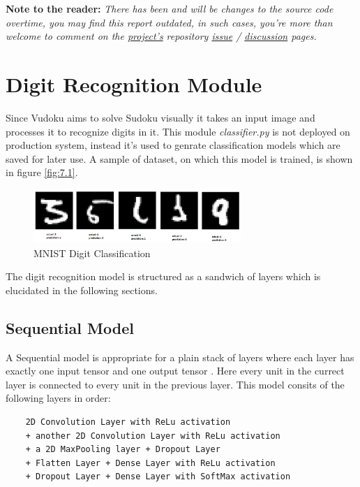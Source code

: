 \documentclass[12pt, a4paper]{report}
\begin{document}
\textbf{Note to the reader:} \textit{There has been and will be changes to the source code overtime, you may find this report outdated, in such cases, you're more than welcome to comment on the \href{https://github.com/joe733/vudoku}{project's} repository \href{https://github.com/joe733/vudoku/issues}{issue} / \href{https://github.com/joe733/vudoku/discussions}{discussion} pages.}

\section{Digit Recognition Module}
\label{sec:drm}
\hspace{0.5cm} Since Vudoku aims to solve Sudoku visually it takes an input image and processes it to recognize digits in it. This module \textit{classifier.py} is not deployed on production system, instead it's used to genrate classification models which are saved for later use. A sample of dataset, on which this model is trained, is shown in figure \eqref{fig:7.1}.

\begin{figure}[!htbp]
    \centering
    \includegraphics[width=0.7\textwidth]{mnist_classification.png}
    \caption[MNIST Digit Classification]{MNIST Digit Classification}
    \label{fig:7.1}
\end{figure}

The digit recognition model is structured as a sandwich of layers which is elucidated in the following sections.

\subsection{Sequential Model}
\label{subsec:seqmod}

\hspace{0.5cm} A Sequential model is appropriate for a plain stack of layers where each layer has exactly one input tensor and one output tensor \cite{wpg:kerasseqmod}. Here every unit in the currect layer is connected to every unit in the previous layer. This model consits of the following layers in order:

\begin{lstlisting}
    2D Convolution Layer with ReLu activation
    + another 2D Convolution Layer with ReLu activation
    + a 2D MaxPooling layer + Dropout Layer
    + Flatten Layer + Dense Layer with ReLu activation
    + Dropout Layer + Dense Layer with SoftMax activation
\end{lstlisting}
\end{document}
